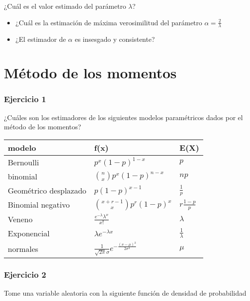 \documentclass[
]{book}
\begin{document}
¿Cuál es el valor estimado del parámetro \(\lambda\)?

\begin{itemize}
\item
  ¿Cuál es la estimación de máxima verosimilitud del parámetro \(\alpha=\frac{2}{\lambda}\)
\item
  ¿El estimador de \(\alpha\) es insesgado y consistente?
\end{itemize}

\hypertarget{muxe9todo-de-los-momentos-11}{%
\section{Método de los momentos}\label{muxe9todo-de-los-momentos-11}}

\hypertarget{ejercicio-1-8}{%
\subsubsection{Ejercicio 1}\label{ejercicio-1-8}}

¿Cuáles son los estimadores de los siguientes modelos paramétricos dados por el método de los momentos?

\begin{longtable}[]{@{}lll@{}}
\toprule
modelo & f(x) & E(X) \\
\midrule
\endhead
Bernoulli & \(p^x(1-p)^{1-x}\) & \(p\) \\
binomial & \(\binom n x p^x(1-p)^{n-x}\) & \(np\) \\
Geométrico desplazado & \(p(1-p)^{x-1}\) & \(\frac{1}{p}\) \\
Binomial negativo & \(\binom {x+r-1} x p^r(1-p)^x\) & \(r\frac{1-p}{p}\) \\
Veneno & \(\frac{e^{-\lambda}\lambda^x}{x!}\) & \(\lambda\) \\
Exponencial & \(\lambda e^{-\lambda x}\) & \(\frac{1}{\lambda}\) \\
normales & \(\frac{1}{\sqrt{2\pi}\sigma}e^{-\frac{(x-\mu)^2}{2\sigma^2}}\) & \(\mu\) \\
\bottomrule
\end{longtable}

\hypertarget{ejercicio-2-8}{%
\subsubsection{Ejercicio 2}\label{ejercicio-2-8}}

Tome una variable aleatoria con la siguiente función de densidad de probabilidad
\end{document}
